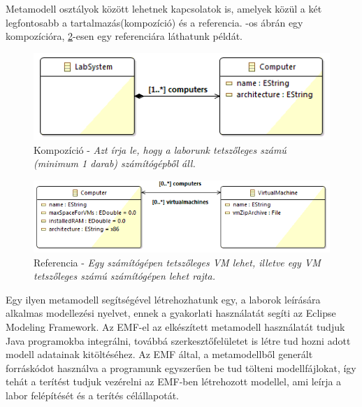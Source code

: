 Metamodell osztályok között lehetnek kapcsolatok is, amelyek közül a két legfontosabb a tartalmazás(kompozíció) és a referencia. -os ábrán egy kompozícióra, \ref{fig:emfref}-esen egy referenciára láthatunk példát.

\begin{figure}[ht!]
	\centering
	\includegraphics[width=115mm, keepaspectratio]{figures/binf_emf_2.png}
	\caption{Kompozíció - \textit{Azt írja le, hogy a laborunk tetszőleges számú (minimum 1 darab) számítógépből áll.}}
	\label{fig:emfcomp}
\end{figure}

\begin{figure}[ht!]
	\centering
	\includegraphics[width=150mm, keepaspectratio]{figures/binf_emf_3.png}
	\caption{Referencia - \textit{Egy számítógépen tetszőleges VM lehet, illetve egy VM tetszőleges számú számítógépen lehet rajta.}}
	\label{fig:emfref}
\end{figure}


Egy ilyen metamodell segítségével létrehozhatunk egy, a laborok leírására alkalmas modellezési nyelvet, ennek a gyakorlati használatát segíti az Eclipse Modeling Framework\cite{steinberg2008emf}. Az EMF-el az elkészített metamodell használatát tudjuk Java programokba integrálni, továbbá szerkesztőfelületet is létre tud hozni adott modell adatainak kitöltéséhez. Az EMF által, a metamodellből generált forráskódot használva a programunk egyszerűen be tud tölteni modellfájlokat, így tehát a terítést tudjuk vezérelni az EMF-ben létrehozott modellel, ami leírja a labor felépítését és a terítés célállapotát.